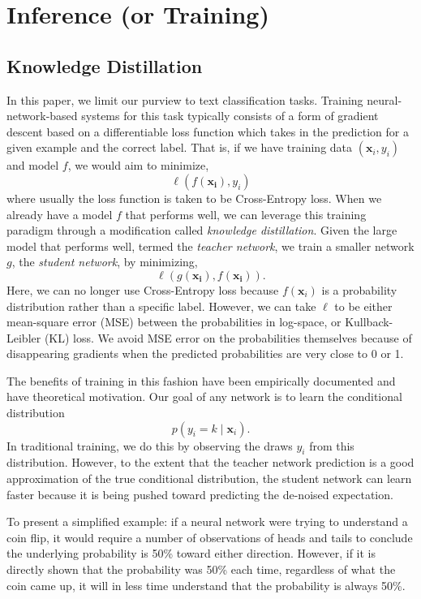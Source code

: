 \documentclass[10pt]{article}
\begin{document}
\section{Inference (or Training)}
\label{sec:training}


\subsection{Knowledge Distillation}
\label{subsec:kd}

In this paper, we limit our purview to text classification tasks. Training
neural-network-based systems for this task typically consists of a form of
gradient descent based on a differentiable loss function which takes in the
prediction for a given example and the correct label. That is, if we have
training data $(\bm{x}_i, y_i)$ and model $f$, we would aim to minimize,
\[ \ell(f(\bm{x_i}), y_i)\]
where usually the loss function is taken to be Cross-Entropy loss. When we
already have a model $f$ that performs well, we can leverage this training
paradigm through a modification called \emph{knowledge distillation}. Given
the large model that performs well, termed the \emph{teacher network}, we
train a smaller network $g$, the \emph{student network}, by minimizing,
\[ \ell(g(\bm{x_i}), f(\bm{x_i})).\]
Here, we can no longer use Cross-Entropy loss because $f(\bm{x}_i)$ is a
probability distribution rather than a specific label. However, we can take
$\ell$ to be either mean-square error (MSE) between the probabilities in
log-space, or Kullback-Leibler (KL) loss. We avoid MSE error on the
probabilities themselves because of disappearing gradients when the predicted
probabilities are very close to 0 or 1.

The benefits of training in this fashion have been empirically documented
\citep{hinton2015distilling}
and have theoretical motivation. Our goal of any network is to learn the
conditional distribution 
\[ p(y_i = k \mid \bm{x}_i).\]
In traditional training, we do this by observing the draws $y_i$ from this
distribution. However, to the extent that the teacher network prediction is a
good approximation of the true conditional distribution, the student network
can learn faster because it is being pushed toward predicting the de-noised
expectation.

To present a simplified example: if a neural network were trying to understand
a coin flip, it would require a number of observations of heads and tails to
conclude the underlying probability is 50\% toward either direction. However,
if it is directly shown that the probability was 50\% each time, regardless of
what the coin came up, it will in less time understand that the probability is
always 50\%.
\end{document}
